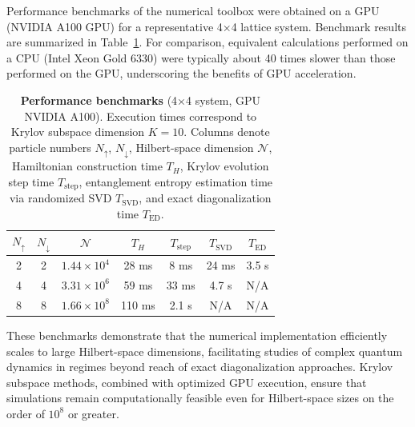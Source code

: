 Performance benchmarks of the numerical toolbox were obtained on a GPU (NVIDIA A100 GPU) for a representative 4×4 lattice system. Benchmark results are summarized in Table~\ref{tab:performance}. For comparison, equivalent calculations performed on a CPU (Intel Xeon Gold 6330) were typically about 40 times slower than those performed on the GPU, underscoring the benefits of GPU acceleration.

\begin{table}
\centering
\caption{
\textbf{Performance benchmarks} (4×4 system, GPU NVIDIA A100).
Execution times correspond to Krylov subspace dimension $K=10$. Columns denote particle numbers $N_\uparrow$, $N_\downarrow$, Hilbert-space dimension $\mathcal{N}$, Hamiltonian construction time $T_H$, Krylov evolution step time $T_{\mathrm{step}}$, entanglement entropy estimation time via randomized SVD $T_{\mathrm{SVD}}$, and exact diagonalization time $T_{\mathrm{ED}}$.
}
\begin{tabular}{ccccccc}
\toprule
$N_\uparrow$ & $N_\downarrow$ & $\mathcal{N}$ & $T_H$ & $T_{\mathrm{step}}$ & $T_{\mathrm{SVD}}$ & $T_{\mathrm{ED}}$ \\
\midrule
2 & 2 & $1.44\times10^4$ & 28 ms & 8 ms & 24 ms & 3.5 s \\
4 & 4 & $3.31\times10^6$ & 59 ms & 33 ms & 4.7 s & N/A \\
8 & 8 & $1.66\times10^8$ & 110 ms & 2.1 s & N/A & N/A \\
\bottomrule
\end{tabular}
\label{tab:performance}
\end{table}

These benchmarks demonstrate that the numerical implementation efficiently scales to large Hilbert-space dimensions, facilitating studies of complex quantum dynamics in regimes beyond reach of exact diagonalization approaches. Krylov subspace methods, combined with optimized GPU execution, ensure that simulations remain computationally feasible even for Hilbert-space sizes on the order of $10^8$ or greater.


